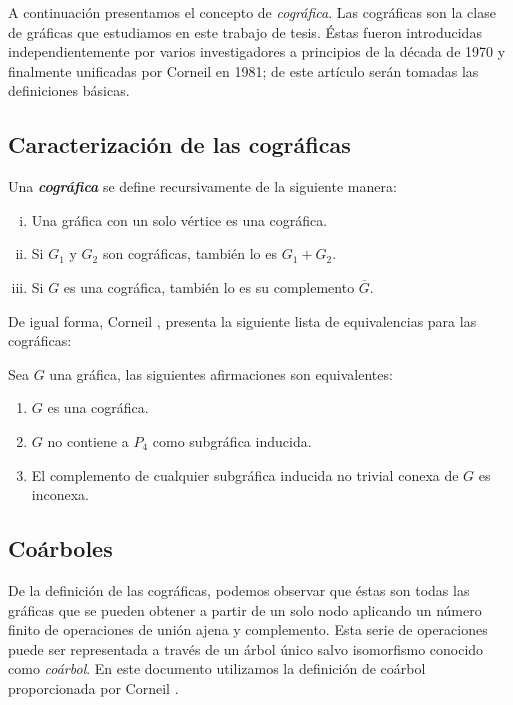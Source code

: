 A continuación presentamos el concepto de \emph{cográfica}. Las cográficas son la clase de gráficas que estudiamos en este trabajo de tesis. Éstas fueron introducidas independientemente por varios investigadores a principios de la década de 1970 y finalmente unificadas por Corneil en 1981\cite{Corneil}; de este artículo serán tomadas las definiciones básicas.

\subsection{Caracterización de las cográficas}

Una \emph{\textbf{cográfica}} se define recursivamente de la siguiente manera:

\begin{enumerate}[(i)]
    \item Una gráfica con un solo vértice es una cográfica.
    \item Si $G_1$ y $G_2$ son cográficas, también lo es $G_1 + G_2$.
    \item Si $G$ es una cográfica, también lo es su complemento $\overline{G}$.
\end{enumerate}

De igual forma, Corneil \cite{Corneil}, presenta la siguiente lista de equivalencias para las cográficas:

Sea $G$ una gráfica, las siguientes afirmaciones son equivalentes:

\begin{enumerate}[(1)]
    \item $G$ es una cográfica.
    \item $G$ no contiene a $P_4$ como subgráfica inducida.
    \item El complemento de cualquier subgráfica inducida no trivial conexa de $G$ es inconexa.
\end{enumerate}

\subsection{Coárboles}
 De la definición de las cográficas, podemos observar que éstas son todas las gráficas que se pueden obtener a partir de un solo nodo aplicando un número finito de operaciones de unión ajena y complemento. Esta serie de operaciones puede ser representada a través de un árbol único salvo isomorfismo conocido como \emph{coárbol}. En este documento utilizamos la definición de coárbol proporcionada por Corneil \cite{Corneil02}.

